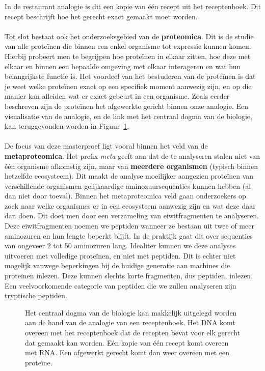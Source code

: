 In de restaurant analogie is dit een kopie van één recept uit het receptenboek.
Dit recept beschrijft hoe het gerecht exact gemaakt moet worden.
\\ \\
Tot slot bestaat ook het onderzoeksgebied van de \textbf{proteomica}.
Dit is de studie van alle proteïnen die binnen een enkel organisme tot expressie kunnen komen.
Hierbij probeert men te begrijpen hoe proteïnen in elkaar zitten, hoe deze met elkaar en binnen een bepaalde omgeving met elkaar interageren en wat hun belangrijkste functie is.
Het voordeel van het bestuderen van de proteïnen is dat je weet welke proteïnen exact op een specifiek moment aanwezig zijn, en op die manier kan afleiden wat er exact gebeurt in een organisme.
Zoals eerder beschreven zijn de proteïnen het afgewerkte gericht binnen onze analogie.
Een visualisatie van de analogie, en de link met het centraal dogma van de biologie, kan teruggevonden worden in Figuur~\ref{fig:recipe}.
\\ \\
De focus van deze masterproef ligt vooral binnen het veld van de \textbf{metaproteomica}.
Het prefix \textit{meta} geeft aan dat de te analyseren stalen niet van één organisme afkomstig zijn, maar van \textbf{meerdere organismen} (typisch binnen hetzelfde ecosysteem).
Dit maakt de analyse moeilijker aangezien proteïnen van verschillende organismen gelijkaardige aminozuursequenties kunnen hebben (al dan niet door toeval).
Binnen het metaproteomica veld gaan onderzoekers op zoek naar welke organismes er in een ecosysteem aanwezig zijn en wat deze daar dan doen.
Dit doet men door een verzameling van eiwitfragmenten te analyseren.
Deze eiwitfragmenten noemen we peptiden wanneer ze bestaan uit twee of meer aminozuren en hun lengte beperkt blijft.
In de praktijk gaat dit over sequenties van ongeveer 2 tot 50 aminozuren lang.
Idealiter kunnen we deze analyses uitvoeren met volledige proteïnen, en niet met peptiden.
Dit is echter niet mogelijk vanwege beperkingen bij de huidige generatie aan machines die proteïnen inlezen.
Deze kunnen slechts korte fragmenten, dus peptiden, inlezen.
Een veelvoorkomende categorie van peptiden die we zullen analyseren zijn tryptische peptiden.

\begin{figure}[H]
    \centering
    
    \caption{Het centraal dogma van de biologie kan makkelijk uitgelegd worden aan de hand van de analogie van een receptenboek. Het DNA komt overeen met het receptenboek dat de recepten bevat voor elk gerecht dat gemaakt kan worden. Eén kopie van één recept komt overeen met RNA. Een afgewerkt gerecht komt dan weer overeen met een proteïne.}
    \label{fig:recipe}
\end{figure}


